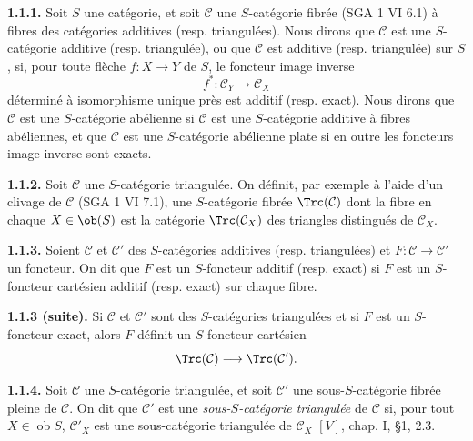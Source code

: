 \documentclass[11pt]{article}
\providecommand{\cC}{\mathcal C}
\providecommand{\Coker}{\operatorname{Coker}}
\providecommand{\Ker}{\operatorname{Ker}}
\providecommand{\cO}{\mathcal O}
\begin{document}
\textbf{1.1.1.} Soit \(S\) une catégorie, et soit \(\mathcal C\) une \(S\)-catégorie fibrée (SGA 1 VI 6.1) à fibres des catégories additives (resp. triangulées). Nous dirons que \(\mathcal C\) est une \(S\)-catégorie additive (resp. triangulée), ou que \(\mathcal C\) est additive (resp. triangulée) sur \(S\), si, pour toute flèche \(f:X\to Y\) de \(S\), le foncteur image inverse
\[
  f^*:\mathcal C_Y\longrightarrow \mathcal C_X
\]
déterminé à isomorphisme unique près est additif (resp. exact). Nous dirons que \(\mathcal C\) est une \(S\)-catégorie abélienne si \(\mathcal C\) est une \(S\)-catégorie additive à fibres abéliennes, et que \(\mathcal C\) est une \(S\)-catégorie abélienne plate si en outre les foncteurs image inverse sont exacts.

\textbf{1.1.2.} Soit \(\mathcal C\) une \(S\)-catégorie triangulée. On définit, par exemple à l'aide d'un clivage de \(\mathcal C\) (SGA 1 VI 7.1), une \(S\)-catégorie fibrée \(\Trc(\mathcal C)\) dont la fibre en chaque \(X\in \ob(S)\) est la catégorie \(\Trc(\mathcal C_X)\) des triangles distingués de \(\mathcal C_X\).

\textbf{1.1.3.} Soient \(\mathcal C\) et \(\mathcal C'\) des \(S\)-catégories additives (resp. triangulées) et \(F:\mathcal C\to\mathcal C'\) un foncteur. On dit que \(F\) est un \(S\)-foncteur additif (resp. exact) si \(F\) est un \(S\)-foncteur cartésien additif (resp. exact) sur chaque fibre.



\providecommand{\cC}{\mathcal C}
\providecommand{\cD}{\mathcal D}
\providecommand{\cK}{\mathcal K}
\providecommand{\cO}{\mathcal O}
\providecommand{\cS}{\mathcal S}
\providecommand{\Cpx}{\mathrm C}
\providecommand{\Kpx}{\mathrm K}
\providecommand{\Dpx}{\mathrm D}
\providecommand{\D}{\mathrm D}
\providecommand{\Ho}{\mathrm H}
\providecommand{\Ob}{\operatorname{ob}}
\providecommand{\Coker}{\operatorname{Coker}}
\providecommand{\Ker}{\operatorname{Ker}}
\providecommand{\Im}{\operatorname{Im}}
\providecommand{\Hom}{\operatorname{Hom}}
\providecommand{\Cone}{\operatorname{Cone}}
\providecommand{\id}{\operatorname{Id}}
\providecommand{\qis}{\xrightarrow{\sim}}


\textbf{1.1.3 (suite).} Si \(\mathcal C\) et \(\mathcal C'\) sont des \(S\)-catégories triangulées et si \(F\) est un \(S\)-foncteur exact, alors \(F\) définit un \(S\)-foncteur cartésien
\[
  \Trc(\mathcal C)\longrightarrow \Trc(\mathcal C').
\]

\textbf{1.1.4.} Soit \(\mathcal C\) une \(S\)-catégorie triangulée, et soit \(\mathcal C'\) une sous-\(S\)-catégorie fibrée pleine de \(\mathcal C\). On dit que \(\mathcal C'\) est une \emph{sous-\(S\)-catégorie triangulée} de \(\mathcal C\) si, pour tout \(X\in\Ob S\), \(\mathcal C'_X\) est une sous-catégorie triangulée de \(\mathcal C_X\) \([V]\), chap. I, §1, 2.3.
\end{document}
